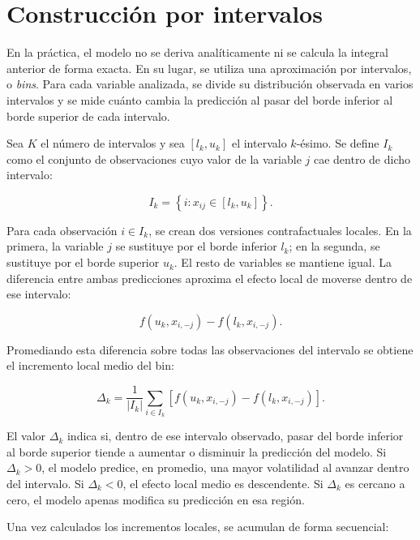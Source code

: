 \section*{Construcción por intervalos}

En la práctica, el modelo no se deriva analíticamente ni se calcula la integral anterior de forma exacta. En su lugar, se utiliza una aproximación por intervalos, o \emph{bins}. Para cada variable analizada, se divide su distribución observada en varios intervalos y se mide cuánto cambia la predicción al pasar del borde inferior al borde superior de cada intervalo.

Sea \(K\) el número de intervalos y sea \([l_k,u_k]\) el intervalo \(k\)-ésimo. Se define \(I_k\) como el conjunto de observaciones cuyo valor de la variable \(j\) cae dentro de dicho intervalo:

\begin{equation}
I_k =
\left\{
i : x_{ij} \in [l_k,u_k]
\right\}.
\end{equation}

Para cada observación \(i \in I_k\), se crean dos versiones contrafactuales locales. En la primera, la variable \(j\) se sustituye por el borde inferior \(l_k\); en la segunda, se sustituye por el borde superior \(u_k\). El resto de variables se mantiene igual. La diferencia entre ambas predicciones aproxima el efecto local de moverse dentro de ese intervalo:

\begin{equation}
f(u_k,x_{i,-j})-f(l_k,x_{i,-j}).
\end{equation}

Promediando esta diferencia sobre todas las observaciones del intervalo se obtiene el incremento local medio del bin:

\begin{equation}
\Delta_k =
\frac{1}{|I_k|}
\sum_{i \in I_k}
\left[
f(u_k,x_{i,-j})-f(l_k,x_{i,-j})
\right].
\label{eq:ale-delta}
\end{equation}

El valor \(\Delta_k\) indica si, dentro de ese intervalo observado, pasar del borde inferior al borde superior tiende a aumentar o disminuir la predicción del modelo. Si \(\Delta_k > 0\), el modelo predice, en promedio, una mayor volatilidad al avanzar dentro del intervalo. Si \(\Delta_k < 0\), el efecto local medio es descendente. Si \(\Delta_k\) es cercano a cero, el modelo apenas modifica su predicción en esa región.

Una vez calculados los incrementos locales, se acumulan de forma secuencial:

